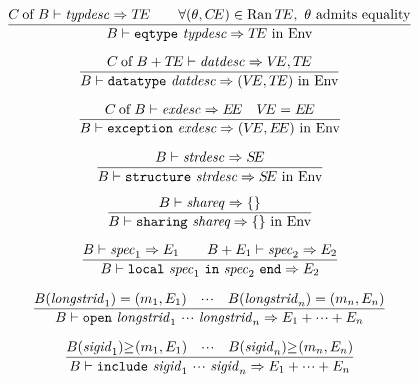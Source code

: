 \begin{equation}        %
\label{eqtypspec-rule}
\frac{ \of{\C}{\B}\ts\typdesc\ra\TE \qquad
       \forall(\theta,\CE)\in \Ran\TE,\ \theta {\rm\ admits\ equality} }
     { \B\ts\eqtypespec\ra\TE\ \In\ \Env }
\end{equation}

\begin{equation}        %
\label{datatypespec-rule}
\frac{ \plusmap{\of{\C}{\B}}{\TE}\ts\datdesc\ra\VE,\TE }
     { \B\ts\datatypespec\ra(\VE,\TE)\ \In\ \Env }
\end{equation}

\begin{equation}        %
\label{exceptionspec-rule}
\frac{ \of{\C}{\B}\ts\exndesc\ra\EE\quad\VE=\EE }
     { \B\ts\exceptionspec\ra(\VE,\EE)\ \In\ \Env }
\end{equation}

\begin{equation}        %
\frac{ \B\ts\strdesc\ra\SE }
     { \B\ts\structurespec\ra\SE\ \In\ \Env }
\end{equation}

\begin{equation}        %
\frac{ \B\ts\shareq\ra\emptymap }
     { \B\ts\sharingspec\ra\emptymap\ \In\ \Env }\index{42.3}
\end{equation}

\begin{equation}        %
\frac{ \B\ts\spec_1\ra\E_1 \qquad \plusmap{\B}{\E_1}\ts\spec_2\ra\E_2 }
     { \B\ts\localspec\ra\E_2 }
\end{equation}

\begin{equation}        %
\frac{ \B(\longstrid_1)=(\m_1,\E_1)\quad\cdots\quad
       \B(\longstrid_n)=(\m_n,\E_n) }
     { \B\ts\openspec\ra\E_1 + \cdots +\E_n }
\end{equation}

\begin{equation}        %
\label{inclspec-rule}
\frac{ \sigord{\B(\sigid_1)}{}{(\m_1,\E_1)} \quad\cdots\quad
       \sigord{\B(\sigid_n)}{}{(\m_n,\E_n)} }
     { \B\ts\inclspec\ra\E_1 + \cdots +\E_n }
\end{equation}

